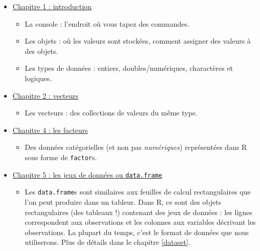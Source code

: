 \documentclass[a4paperpaper,]{article}
\providecommand{\tightlist}{%
  \setlength{\itemsep}{0pt}\setlength{\parskip}{0pt}}
\begin{document}
\begin{itemize}
\tightlist
\item
  \href{https://campus.datacamp.com/courses/introduction-a-r/chapitre-1-introduction?ex=1}{Chapitre 1 : introduction}

  \begin{itemize}
  \tightlist
  \item
    La console : l'endroit où vous tapez des commandes.
  \item
    Les objets : où les valeurs sont stockées, comment assigner des valeurs à des objets.
  \item
    Les types de données : entiers, doubles/numériques, charactères et logiques.
  \end{itemize}
\item
  \href{https://campus.datacamp.com/courses/introduction-a-r/chapitre-2-les-vecteurs?ex=1}{Chapitre 2 : vecteurs}

  \begin{itemize}
  \tightlist
  \item
    Les vecteurs : des collections de valeurs du même type.
  \end{itemize}
\item
  \href{https://campus.datacamp.com/courses/introduction-a-r/chapitre-4-facteurs?ex=1}{Chapitre 4 : les facteurs}

  \begin{itemize}
  \tightlist
  \item
    Des données catégorielles (et non pas \emph{numériques}) représentées dans R sous forme de \texttt{factor}s.
  \end{itemize}
\item
  \href{https://campus.datacamp.com/courses/introduction-a-r/chapitre-5-les-jeux-de-donnees?ex=1}{Chapitre 5 : les jeux de données ou \texttt{data.frame}}

  \begin{itemize}
  \tightlist
  \item
    Les \texttt{data.frame}s sont similaires aux feuilles de calcul rectangulaires que l'on peut produire dans un tableur. Dans R, ce sont des objets rectangulaires (des tableaux !) contenant des jeux de données : les lignes correspondent aux observations et les colonnes aux variables décrivant les observations. La plupart du temps, c'est le format de données que nous utiliserons. Plus de détails dans le chapitre \ref{dataset}.
  \end{itemize}
\end{itemize}
\end{document}
